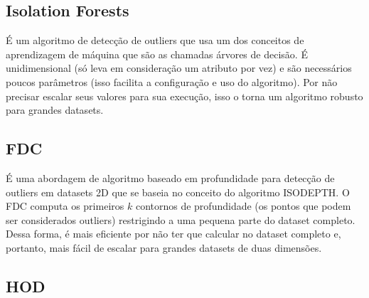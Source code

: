 \subsection{Isolation Forests}


É um algoritmo de detecção de outliers \cite{IsolationForests} que usa um dos conceitos de aprendizagem de máquina que são as chamadas árvores de decisão. É unidimensional (só leva em consideração um atributo por vez) e são necessários poucos parâmetros (isso facilita a configuração e uso do algoritmo). Por não precisar escalar seus valores para sua execução, isso o torna um algoritmo robusto para grandes datasets.


\subsection{FDC}


É uma abordagem de algoritmo baseado em profundidade \cite{Johnson:1998:FCD:3000292.3000332} para detecção de outliers em datasets 2D que se baseia no conceito do algoritmo ISODEPTH.
O FDC computa os primeiros $k$ contornos de profundidade (os pontos que podem ser considerados outliers) restrigindo a uma pequena parte do dataset completo. Dessa forma, é mais eficiente por não ter que calcular no dataset completo e, portanto, mais fácil de escalar para grandes datasets de duas dimensões.

\subsection{HOD}

